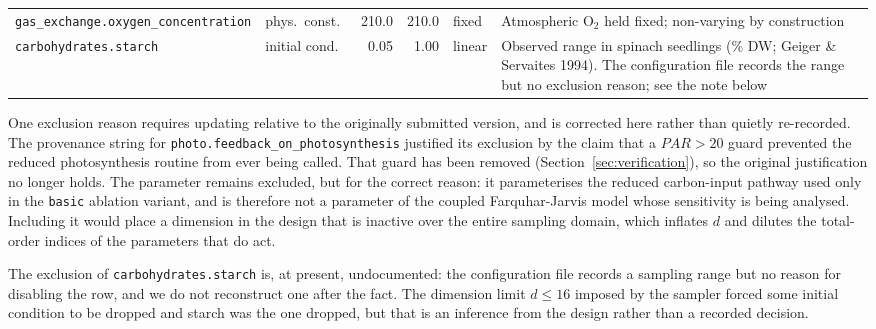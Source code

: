 \documentclass[a4paper,fleqn]{cas-sc}
\begin{document}
\begin{table}[!htbp]
\begin{tabular}{@{}@{}>{\raggedright\arraybackslash}p{}lrrl>{\raggedright\arraybackslash}p{}@{}}
\texttt{gas\_\allowbreak exchange.\allowbreak oxygen\_\allowbreak concentration}  & phys.\ const.\ & 210.0 & 210.0 & fixed & Atmospheric O$_2$ held fixed; non-varying by construction \\
\texttt{carbohydrates.\allowbreak starch}                 & initial cond.\ & 0.05 & 1.00  & linear & Observed range in spinach seedlings (\% DW; Geiger \& Servaites 1994). The configuration file records the range but no exclusion reason; see the note below \\
\bottomrule
\end{tabular}
\end{table}

One exclusion reason requires updating relative to the originally submitted
version, and is corrected here rather than quietly re-recorded. The
provenance string for \texttt{photo.feedback\_on\_photosynthesis} justified
its exclusion by the claim that a $\mathit{PAR}>20$ guard prevented the
reduced photosynthesis routine from ever being called. That guard has been
removed (Section~\ref{sec:verification}), so the original justification no
longer holds. The parameter remains excluded, but for the correct reason:
it parameterises the reduced carbon-input pathway used only in the
\texttt{basic} ablation variant, and is therefore not a parameter of the
coupled Farquhar-Jarvis model whose sensitivity is being analysed. Including
it would place a dimension in the design that is inactive over the entire
sampling domain, which inflates $d$ and dilutes the total-order indices of
the parameters that do act.

The exclusion of \texttt{carbohydrates.starch} is, at present, undocumented:
the configuration file records a sampling range but no reason for disabling
the row, and we do not reconstruct one after the fact. The dimension limit
$d\le16$ imposed by the sampler forced some initial condition to be dropped
and starch was the one dropped, but that is an inference from the design
rather than a recorded decision.


\printcredits

%

\end{document}

